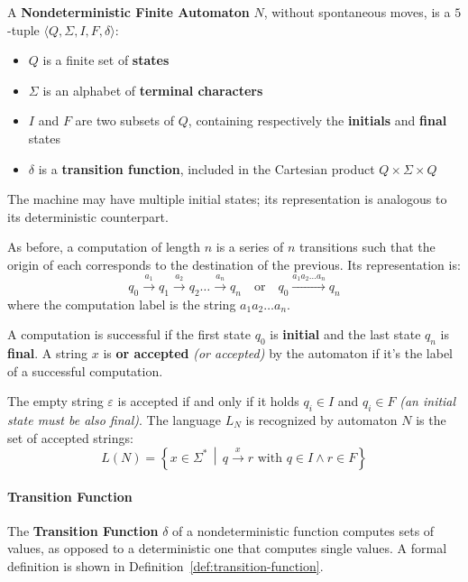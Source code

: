 \documentclass[english]{article}
\begin{document}
\begin{definition}
  \label{def:nondeterministic-finite-automaton}
  A \textbf{Nondeterministic Finite Automaton} \(N\), without spontaneous moves, is a \(5\)-tuple \(\langle Q, \Sigma, I, F, \delta \rangle\):

  \begin{itemize}
    \item \(Q\) is a finite set of \textbf{states}
    \item \(\Sigma\) is an alphabet of \textbf{terminal characters}
    \item \(I\) and \(F\) are two subsets of \(Q\), containing respectively the \textbf{initials} and \textbf{final} states
    \item \(\delta\) is a \textbf{transition function}, included in the Cartesian product \(Q \times \Sigma \times Q\)
  \end{itemize}

  The machine may have multiple initial states;
  its representation is analogous to its deterministic counterpart.
\end{definition}

As before, a computation of length \(n\) is a series of \(n\) transitions such that the origin of each corresponds to the destination of the previous. Its representation is:
\[ q_0 \xrightarrow{a_1} q_1 \xrightarrow{a_2} q_2 \ldots \xrightarrow{a_n} q_n \quad \text{or} \quad q_0 \xrightarrow{a_1 a_2 \ldots a_n} q_n \]
where the computation label is the string \(a_1 a_2 \ldots a_n\).

A computation is successful if the first state \(q_0\) is \textbf{initial} and the last state \(q_n\) is \textbf{final}.
A string \(x\) is \textbf{or accepted} \textit{(or accepted)} by the automaton if it's the label of a successful computation.

The empty string \(\varepsilon\) is accepted if and only if it holds \(q_i \in I\) and \(q_i \in F\) \textit{(an initial state must be also final)}.
The language \(L_N\) is recognized by automaton \(N\) is the set of accepted strings:
\[ L(N) = \left\{ x \in \Sigma^\ast \, \middle\vert \, q \xrightarrow{x} r \text{ with } q \in I \land r \in F \right\} \]

\paragraph{Transition Function}

The \textbf{Transition Function} \(\delta\) of a nondeterministic function computes sets of values, as opposed to a deterministic one that computes single values.
A formal definition is shown in Definition~\ref{def:transition-function}.
\end{document}
